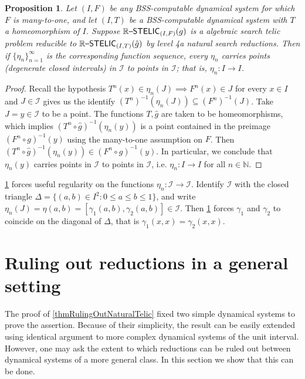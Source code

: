 \documentclass{amsart}
\theoremstyle{theorem}
\newtheorem{proposition}[theorem]{Proposition}
\theoremstyle{remark}
\newcommand{\NN}{\mathbb{N}}
\newcommand{\ccRSTELIC}{\mathbb{R}\textsf{\upshape --STELIC}}
\newcommand{\cI}{\mathcal{I}}
\begin{document}
\begin{proposition}\label{propLevel4aRegularity}
Let $(I, F)$ be any BSS-computable dynamical system for which $F$ is many-to-one, and let $(I, T)$ be a BSS-computable dynamical system with $T$ a homeomorphism of $I$. Suppose $\ccRSTELIC_{(I, F)}(g)$ is a algebraic search telic problem reducible to $\ccRSTELIC_{(I, T)}(\hat{g})$ by level 4a natural search reductions. Then if $\{\eta_n\}_{n=1}^\infty$ is the corresponding function sequence, every $\eta_n$ carries points (degenerate closed intervals) in $\cI$ to points in $\cI$; that is, $\eta_n:I\rightarrow I$.
\end{proposition}
\begin{proof}
Recall the hypothesis $T^n(x) \in \eta_n(J) \implies F^n(x) \in J$ for every $x \in I$ and $J \in \cI$ gives us the identify $(T^n)^{-1}(\eta_n(J)) \subseteq (F^n)^{-1}(J)$.
Take $J = y \in \cI$ to be a point.
The functions $T, \hat{g}$ are taken to be homeomorphisms, which implies $(T^n\circ \hat{g})^{-1}(\eta_n(y))$ is a point contained in the preimage $(F^n \circ g)^{-1}(y)$ using the many-to-one assumption on $F$.
Then $(T^n\circ \hat{g})^{-1}(\eta_n(y)) \in (F^n \circ g)^{-1}(y)$. In particular, we conclude that $\eta_n(y)$ carries points in $\cI$ to points in $\cI$, i.e. $\eta_n:I\rightarrow I$ for all $n \in \NN$.
\end{proof}

\cref{propLevel4aRegularity} forces useful regularity on the functions $\eta_n:\cI\rightarrow \cI$. Identify $\cI$ with the closed triangle $\Delta = \{(a, b) \in I^2: 0\leq a\leq b\leq 1\}$, and write $\eta_n(J) = \eta(a, b) = [\gamma_1(a, b), \gamma_2(a, b)] \in \cI$. Then \cref{propLevel4aRegularity} forces $\gamma_1$ and $\gamma_2$ to coincide on the diagonal of $\Delta$, that is $\gamma_1(x, x) = \gamma_2(x,x)$.


\appendix

\section{Ruling out reductions in a general setting}\label{secGeneralReductions}

The proof of \cref{thmRulingOutNaturalTelic} fixed two simple dynamical systems to prove the assertion. Because of their simplicity, the result can be easily extended using identical argument to more complex dynamical systems of the unit interval.
However, one may ask the extent to which reductions can be ruled out between dynamical systems of a more general class. In this section we show that this can be done.
\end{document}
